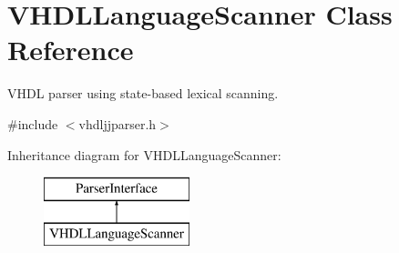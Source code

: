 \hypertarget{class_v_h_d_l_language_scanner}{}\section{V\+H\+D\+L\+Language\+Scanner Class Reference}
\label{class_v_h_d_l_language_scanner}


V\+H\+DL parser using state-\/based lexical scanning.  




{\ttfamily \#include $<$vhdljjparser.\+h$>$}

Inheritance diagram for V\+H\+D\+L\+Language\+Scanner\+:\begin{figure}[H]
\begin{center}
\leavevmode
\includegraphics[height=2.000000cm]{class_v_h_d_l_language_scanner}
\end{center}
\end{figure}

